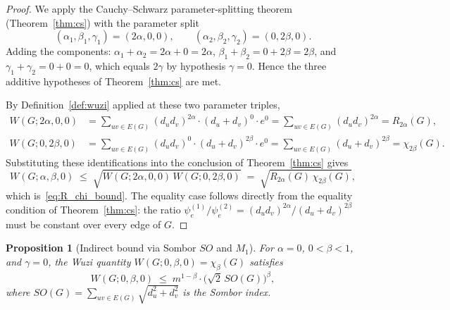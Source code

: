 \documentclass[a5paper, 10pt]{article}
\theoremstyle{plain}
\newtheorem{proposition}[theorem]{Proposition}
\theoremstyle{remark}
\theoremstyle{definition}
\begin{document}
\begin{proof}
We apply the Cauchy--Schwarz parameter-splitting theorem
(Theorem~\ref{thm:cs}) with the parameter split
\[
(\alpha_1, \beta_1, \gamma_1) = (2\alpha, 0, 0),
\qquad
(\alpha_2, \beta_2, \gamma_2) = (0, 2\beta, 0).
\]
Adding the components:
$\alpha_1 + \alpha_2 = 2\alpha + 0 = 2\alpha$,
$\beta_1 + \beta_2 = 0 + 2\beta = 2\beta$, and
$\gamma_1 + \gamma_2 = 0 + 0 = 0$, which equals $2\gamma$ by
hypothesis $\gamma = 0$. Hence the three additive hypotheses of
Theorem~\ref{thm:cs} are met.

By Definition~\ref{def:wuzi} applied at these two parameter
triples,
\begin{align*}
W(G; 2\alpha, 0, 0)
&= \sum_{uv \in E(G)} (d_u d_v)^{2\alpha} \cdot (d_u + d_v)^{0}
   \cdot e^{0}
 = \sum_{uv \in E(G)} (d_u d_v)^{2\alpha}
 = R_{2\alpha}(G), \\
W(G; 0, 2\beta, 0)
&= \sum_{uv \in E(G)} (d_u d_v)^{0} \cdot (d_u + d_v)^{2\beta}
   \cdot e^{0}
 = \sum_{uv \in E(G)} (d_u + d_v)^{2\beta}
 = \chi_{2\beta}(G).
\end{align*}
Substituting these identifications into the conclusion of
Theorem~\ref{thm:cs} gives
\[
W(G; \alpha, \beta, 0)
\;\le\;
\sqrt{W(G; 2\alpha, 0, 0)\, W(G; 0, 2\beta, 0)}
\;=\;
\sqrt{R_{2\alpha}(G)\, \chi_{2\beta}(G)},
\]
which is~\eqref{eq:R_chi_bound}. The equality case follows
directly from the equality condition of Theorem~\ref{thm:cs}: the
ratio $\psi_e^{(1)}/\psi_e^{(2)} = (d_u d_v)^{2\alpha}/(d_u + d_v)^{2\beta}$
must be constant over every edge of $G$.
\end{proof}

\begin{proposition}[Indirect bound via Sombor $SO$ and $M_1$]\label{thm:sombor}
For $\alpha = 0$, $0 < \beta < 1$, and $\gamma = 0$, the Wuzi
quantity $W(G; 0, \beta, 0) = \chi_{\beta}(G)$ satisfies
\begin{equation}\label{eq:sombor_bound}
W(G; 0, \beta, 0)
\;\le\; m^{1 - \beta} \cdot \bigl(\sqrt{2}\, SO(G)\bigr)^{\beta},
\end{equation}
where $SO(G) = \sum_{uv \in E(G)} \sqrt{d_u^2 + d_v^2}$ is the
Sombor index.
\end{proposition}
\end{document}
